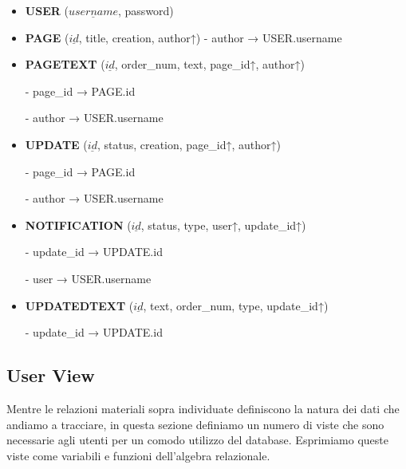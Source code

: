 \documentclass{article}
\begin{document}
	\begin{itemize}
		\item \textbf{USER} ($\underline{username}$, password)
		
		\item \textbf{PAGE} ($\underline{id}$, title, creation, author↑)
		- author → USER.username
		
		\item \textbf{PAGETEXT} ($\underline{id}$, order\_num, text, page\_id↑, author↑)
		
		- page\_id → PAGE.id
		
		- author → USER.username
		
		\item \textbf{UPDATE} ($\underline{id}$, status, creation, page\_id↑, author↑)
		
		- page\_id → PAGE.id
		
		- author → USER.username
		
		\item \textbf{NOTIFICATION} ($\underline{id}$, status, type, user↑, update\_id↑)
		
		- update\_id → UPDATE.id
		
		- user → USER.username
		
		\item \textbf{UPDATEDTEXT} ($\underline{id}$, text, order\_num, type, update\_id↑)
		
		- update\_id → UPDATE.id
	\end{itemize}
	
	\subsection{User View}
	Mentre le relazioni materiali sopra individuate definiscono la natura dei dati
	che andiamo a tracciare, in questa sezione definiamo un numero di viste che
	sono necessarie agli utenti per un comodo utilizzo del database. Esprimiamo
	queste viste come variabili e funzioni dell’algebra relazionale.
	
\end{document}
